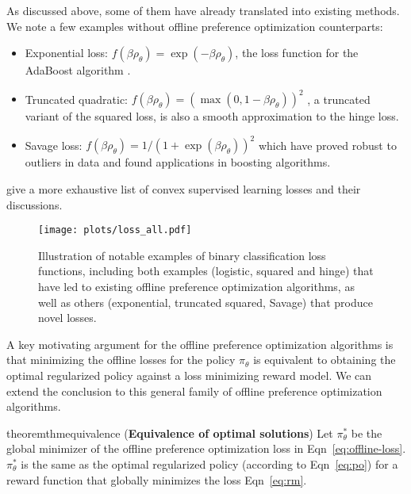 As discussed above, some of them have already translated into existing methods.
We note a few examples without offline preference optimization counterparts:
\begin{itemize}
    \item Exponential loss: $f(\beta\rho_\theta)=\exp(-\beta\rho_\theta)$, the loss function for the AdaBoost algorithm \citep{freund1995desicion}.
    \item Truncated quadratic: $f(\beta\rho_\theta)=\left(\max\left(0,1-\beta\rho_\theta\right)\right)^2$ \citep{bartlett2006convexity}, a truncated variant of the squared loss, is also a smooth approximation to the hinge loss.
    \item Savage loss: $f(\beta\rho_\theta)=1/\left(1+\exp(\beta\rho_\theta)\right)^2$ \citep{masnadi2008design} which have proved robust to outliers in data and found applications in boosting algorithms.
\end{itemize}
\citet{rosasco2004loss,bartlett2006convexity} give a more exhaustive list of convex supervised learning losses and their discussions.

\begin{figure}[t]
    \centering
    \texttt{[image: plots/loss\_all.pdf]}
    \caption{\small{Illustration of notable examples of binary classification loss functions, including both examples (logistic, squared and hinge) that have led to existing offline preference optimization algorithms, as well as others (exponential, truncated squared, Savage) that produce novel losses.}}
    \label{fig:loss-all}
\end{figure}

A key motivating argument for the offline preference optimization algorithms \citep{rafailov2023direct,azar2023general,zhao2023SLiC} is that minimizing the offline losses for the policy $\pi_\theta$ is equivalent to obtaining the optimal regularized policy against a loss minimizing reward model. We can extend the conclusion to this general family of offline preference optimization algorithms.

\begin{restatable}{theorem}{thmequivalence}\label{thm:equivalence}
    (\textbf{Equivalence of optimal solutions}) Let $\pi_\theta^\ast$ be the global minimizer of the offline preference optimization loss in Eqn~\eqref{eq:offline-loss}. $\pi_\theta^\ast$ is the same as the optimal regularized policy (according to Eqn~\eqref{eq:po}) for a reward function that globally minimizes the loss Eqn~\eqref{eq:rm}.
\end{restatable}

